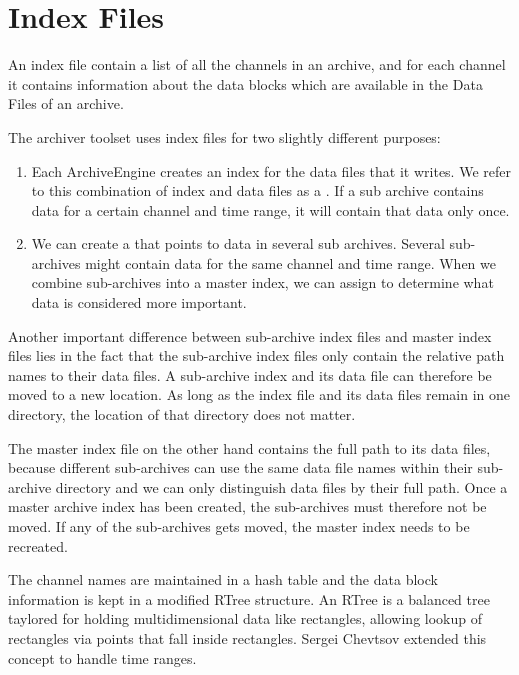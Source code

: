 \section{Index Files}
An index file contain a list of all the channels in an archive, and
for each channel it contains information about the data blocks which
are available in the Data Files of an archive.

\noindent The archiver toolset uses index files for two slightly different
purposes:
\begin{enumerate}
\item Each ArchiveEngine creates an index for the data files
      that it writes.
      We refer to this combination of index and data files
      as a .
      If a sub archive contains data for a certain channel and time
      range, it will contain that data only once.
\item We can create a  that points to data
      in several sub archives.
      Several sub-archives might contain data for the same channel
      and time range. When we combine sub-archives into a master
      index, we can assign  to
      determine what data is considered more important.
\end{enumerate}

\noindent Another important difference between sub-archive index files
and master index files lies in the fact that the sub-archive index
files only contain the relative path names to their data files.
A sub-archive index and its data file can therefore be moved to a new
location. As long as the index file and its data files remain
in one directory, the location of that directory does not matter.

The master index file on the other hand contains the full path to its
data files, because different sub-archives can use the same data file
names within their sub-archive directory and we can only distinguish
data files by their full path.  Once a master archive index has been
created, the sub-archives must therefore not be moved. If any of the
sub-archives gets moved, the master index needs to be recreated.

The channel names are maintained in a hash table and the
data block information is kept in a modified RTree structure.
An RTree \cite{guttman84} is a balanced tree taylored for holding
multidimensional data like rectangles, allowing lookup of
rectangles via points that fall inside rectangles.
Sergei Chevtsov extended this concept to handle time ranges.

